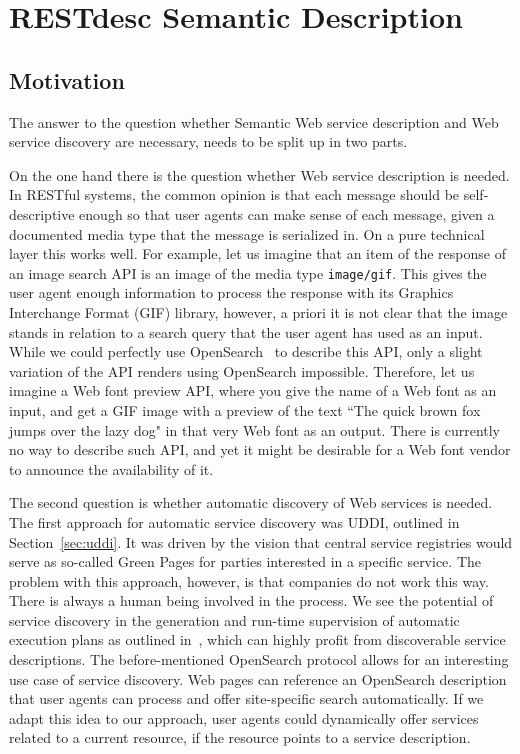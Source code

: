 \documentclass[runningheads,a4paper, twocolumn]{llncs}
\begin{document}
\section{RESTdesc Semantic Description} \label{sec:restdesc-semantic-description}
\label{RESTdesc}
\subsection{Motivation}
The answer to the question whether Semantic Web service description and Web service discovery are necessary, needs to be split up in two parts.

On the one hand there is the question whether Web service description is needed. In RESTful systems, the common opinion is that each message should be self-descriptive enough so that user agents can make sense of each message, given a documented media type that the message is serialized in. On a pure technical layer this works well. For example, let us imagine that an item of the response of an image search API is an image of the media type \texttt{image/gif}. This gives the user agent enough information to process the response with its Graphics Interchange Format (GIF) library, however, a priori it is not clear that the image stands in relation to a search query that the user agent has used as an input. While we could perfectly use OpenSearch~\cite{OpenSearch} to describe this API, only a slight variation of the API renders using OpenSearch impossible. Therefore, let us imagine a Web font preview API, where you give the name of a Web font as an input, and get a GIF image with a preview of the text ``The quick brown fox jumps over the lazy dog" in that very Web font as an output. There is currently no way to describe such API, and yet it might be desirable for a Web font vendor to announce the availability of it. 

The second question is whether automatic discovery of Web services is needed. The first approach for automatic service discovery was UDDI, outlined in Section~\ref{sec:uddi}. It was driven by the vision that central service registries would serve as so-called Green Pages for parties interested in a specific service. The problem with this approach, however, is that companies do not work this way. There is always a human being involved in the process\cite{UDDIDiscontinue}. We see the potential of service discovery in the generation and run-time supervision of automatic execution plans as outlined in~\cite{Verborgh:2011p4792}, which can highly profit from discoverable service descriptions. The before-mentioned OpenSearch protocol allows for an interesting use case of service discovery. Web pages can reference an OpenSearch description that user agents can process and offer site-specific search automatically. If we adapt this idea to our approach, user agents could dynamically offer services related to a current resource, if the resource points to a service description.
\end{document}
